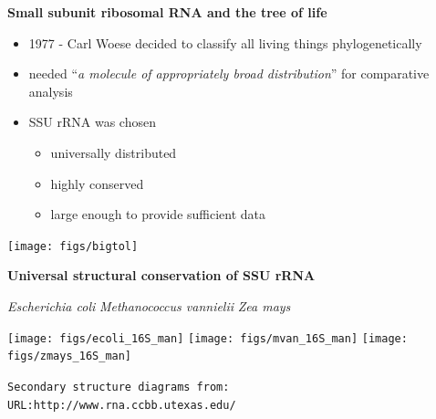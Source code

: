 \documentclass[landscape]{slides}
\begin{document}
\begin{slide}
\begin{center}

\textbf{Small subunit ribosomal RNA and the tree of life}
\end{center}
\medskip
\begin{minipage}{5.2in}
\small

\begin{itemize}
\item
1977 - Carl Woese decided to classify all living things phylogenetically
\item
needed ``\emph{a molecule of appropriately broad distribution}'' for
comparative analysis
\item
SSU rRNA was chosen
\begin{itemize}
  \item
    universally distributed
  \item
    highly conserved 
  \item
    large enough to provide sufficient data%
\end{itemize}
\end{itemize}

\vspace{2.7in}
\end{minipage}
\hspace{0.1in}
\begin{minipage}{5.5in}
\texttt{[image: figs/bigtol]}
\end{minipage}  

\end{slide}

\begin{slide}
\begin{center}

\textbf{Universal structural conservation of SSU rRNA}
\end{center}
\vspace{0.5in}
\small
\hspace{0.75in}
\emph{Escherichia coli}
\hspace{1.2in}
\emph{Methanococcus vannielii}
\hspace{1.2in}
\emph{Zea mays}

\begin{center}
\texttt{[image: figs/ecoli\_16S\_man]}
\texttt{[image: figs/mvan\_16S\_man]}
\texttt{[image: figs/zmays\_16S\_man]}
\end{center}

\begin{flushright}
\tiny{\texttt{Secondary structure diagrams from:}} \\
\tiny{\texttt{URL:http://www.rna.ccbb.utexas.edu/}}
\end{flushright}
\vfill
\end{slide}
\end{document}
